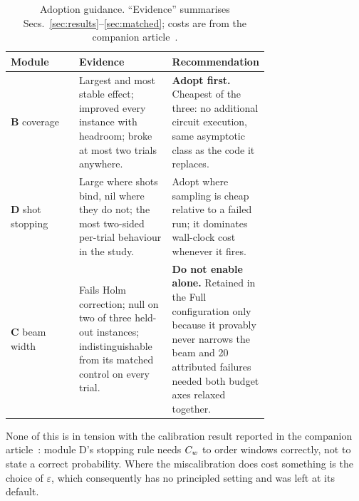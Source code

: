 \begin{table}[htbp]
\centering\small
\caption{Adoption guidance. ``Evidence'' summarises
Secs.~\ref{sec:results}--\ref{sec:matched}; costs are from the companion
article~\cite{methodpaper}.}
\label{tab:adopt}
\begin{tabular}{@{}lp{0.36\linewidth}p{0.36\linewidth}@{}}
\toprule
Module & Evidence & Recommendation \\
\midrule
\textbf{B} coverage
 & Largest and most stable effect; improved every instance with
   headroom; broke at most two trials anywhere.
 & \textbf{Adopt first.} Cheapest of the three: no additional circuit
   execution, same asymptotic class as the code it replaces. \\[3pt]
\textbf{D} shot stopping
 & Large where shots bind, nil where they do not; the most two-sided
   per-trial behaviour in the study.
 & Adopt where sampling is cheap relative to a failed run; it dominates
   wall-clock cost whenever it fires. \\[3pt]
\textbf{C} beam width
 & Fails Holm correction; null on two of three held-out instances;
   indistinguishable from its matched control on every trial.
 & \textbf{Do not enable alone.} Retained in the Full configuration only
   because it provably never narrows the beam and 20 attributed failures
   needed both budget axes relaxed together. \\
\bottomrule
\end{tabular}
\end{table}

None of this is in tension with the calibration result reported in the
companion article~\cite{methodpaper}: module D's stopping rule needs
$C_w$ to order windows correctly, not to state a correct probability. Where the
miscalibration does cost something is the choice of $\varepsilon$, which
consequently has no principled setting and was left at its default.


